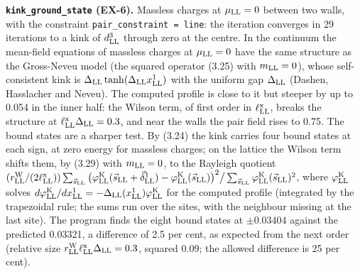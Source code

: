 \documentclass[
  10pt,
]{article}
\begin{document}
\textbf{\texttt{kink\_ground\_state} (EX-6).} Massless charges at
\(\mu_{\rm LL}=0\) between two walls, with the constraint
\texttt{pair\_constraint\ =\ line}: the iteration converges in 29
iterations to a kink of \(d^3_{\rm LL}\) through zero at the centre. In
the continuum the mean-field equations of massless charges at
\(\mu_{\rm LL}=0\) have the same structure as the Gross-Neveu model (the
squared operator (3.25) with \(m_{\rm LL}=0\)), whose self-consistent
kink is \(\Delta_{\rm LL}\tanh(\Delta_{\rm LL}x^1_{\rm LL})\) with the
uniform gap \(\Delta_{\rm LL}\) (Dashen, Hasslacher and Neveu). The
computed profile is close to it but steeper by up to 0.054 in the inner
half: the Wilson term, of first order in \(\ell^{\rm x}_{\rm LL}\),
breaks the structure at \(\ell^{\rm x}_{\rm LL}\Delta_{\rm LL}=0.3\),
and near the walls the pair field rises to 0.75. The bound states are a
sharper test. By (3.24) the kink carries four bound states at each sign,
at zero energy for massless charges; on the lattice the Wilson term
shifts them, by (3.29) with \(m_{\rm LL}=0\), to the Rayleigh quotient
\((r^{\rm W}_{\rm LL}/(2\ell^{\rm x}_{\rm LL}))\sum_{\vec s_{\rm LL}}\big(\varphi^{\rm K}_{\rm LL}(\vec s_{\rm LL}+\vec\delta^1_{\rm LL})-\varphi^{\rm K}_{\rm LL}(\vec s_{\rm LL})\big)^2\big/\sum_{\vec s_{\rm LL}}\varphi^{\rm K}_{\rm LL}(\vec s_{\rm LL})^2\),
where \(\varphi^{\rm K}_{\rm LL}\) solves
\(d\varphi^{\rm K}_{\rm LL}/dx^1_{\rm LL}=-\Delta_{\rm LL}(x^1_{\rm LL})\varphi^{\rm K}_{\rm LL}\)
for the computed profile (integrated by the trapezoidal rule; the sums
run over the sites, with the neighbour missing at the last site). The
program finds the eight bound states at \(\pm0.03404\) against the
predicted 0.03321, a difference of 2.5 per cent, as expected from the
next order (relative size
\(r^{\rm W}_{\rm LL}\ell^{\rm x}_{\rm LL}\Delta_{\rm LL}=0.3\), squared
0.09; the allowed difference is 25 per cent).
\end{document}
